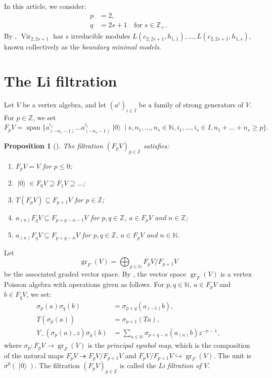 \documentclass[a4paper, 12pt, reqno]{amsart}
\newtheorem{proposition}[theorem]{Proposition}
\theoremstyle{remark}
\DeclareMathOperator{\Vir}{Vir}
\DeclareMathOperator{\vac}{|0\rangle}
\DeclareMathOperator{\gr}{gr}
\DeclareMathOperator{\vspan}{span}
\begin{document}
In this article, we consider:
\begin{align*}
  p &= 2, \\
  q &= 2s + 1 \quad \text{for $s \in \mathbb{Z}_+$}.
\end{align*}
By , $\Vir_{2, 2s + 1}$ has $s$ irreducible modules $L(c_{2, 2s + 1}, h_{1, 1}), \dots, L(c_{2, 2s + 1}, h_{1, s})$, known collectively as the \emph{boundary minimal models}.

\section{The Li filtration}
\label{sec:li-filtr}

Let $V$ be a vertex algebra, and let $(a^i)_{i \in I}$ be a family of strong generators of $V$.
For $p \in \mathbb{Z}$, we set
\begin{equation*}
  F_pV = \vspan\{a^{i_1}_{(-n_1 - 1)}\dots a^{i_s}_{(-n_s - 1)}\vac \mid s, n_1, \dots, n_s \in \mathbb{N}, i_1, \dots, i_s \in I, n_1 + \dots + n_s \ge p\}.
\end{equation*}

\begin{proposition}[{\cite{li_abelianizing_2005}}]
  \label{prp:4}
  The filtration $(F_pV)_{p \in \mathbb{Z}}$ satisfies:
  \begin{enumerate}
  \item $F_pV = V$ for $p \le 0$;
  \item $\vac \in F_0V \supseteq F_1V \supseteq \dots$;
  \item $T(F_pV) \subseteq F_{p + 1}V$ for $p \in \mathbb{Z}$;
  \item $a_{(n)}F_qV \subseteq F_{p + q - n - 1}V$ for $p, q \in \mathbb{Z}$, $a \in F_pV$ and $n \in \mathbb{Z}$;
  \item $a_{(n)}F_qV \subseteq F_{p + q - n}V$ for $p, q \in \mathbb{Z}$, $a \in F_pV$ and $n \in \mathbb{N}$.
  \end{enumerate}
\end{proposition}

Let
\begin{equation*}
  \gr_F(V) = \bigoplus_{p \in \mathbb{N}}F_pV/F_{p + 1}V
\end{equation*}
be the associated graded vector space.
By \cite{li_abelianizing_2005}, the vector space $\gr_F(V)$ is a vertex Poisson algebra with operations given as follows.
For $p, q \in \mathbb{N}$, $a \in F_pV$ and $b \in F_qV$, we set:
\begin{align*}
  \sigma_p(a)\sigma_q(b) &= \sigma_{p + q}(a_{(-1)}b), \\
  T(\sigma_p(a)) &= \sigma_{p + 1}(Ta), \\
  Y_-(\sigma_p(a), z)\sigma_q(b) &= \sum_{n \in \mathbb{N}}\sigma_{p + q - n}(a_{(n)}b)z^{-n - 1},
\end{align*}
where $\sigma_p: F_pV \to \gr_F(V)$ is the \emph{principal symbol map}, which is the composition of the natural maps $F_pV \twoheadrightarrow F_pV/F_{p + 1}V$ and $F_pV/F_{p + 1}V \hookrightarrow \gr_F(V)$.
The unit is $\sigma^0(\vac)$.
The filtration $(F_pV)_{p \in \mathbb{Z}}$ is called the \emph{Li filtration of $V$}.
\end{document}

